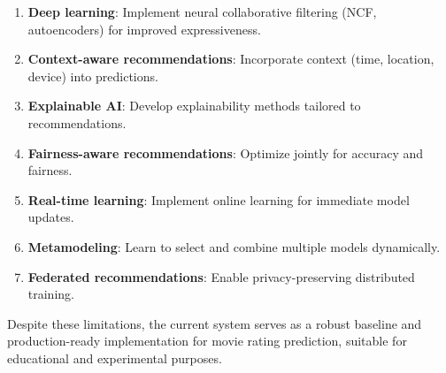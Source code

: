 \begin{enumerate}
  \item \textbf{Deep learning}: Implement neural collaborative filtering (NCF, autoencoders) for improved 
  expressiveness.
  
  \item \textbf{Context-aware recommendations}: Incorporate context (time, location, device) into predictions.
  
  \item \textbf{Explainable AI}: Develop explainability methods tailored to recommendations.
  
  \item \textbf{Fairness-aware recommendations}: Optimize jointly for accuracy and fairness.
  
  \item \textbf{Real-time learning}: Implement online learning for immediate model updates.
  
  \item \textbf{Metamodeling}: Learn to select and combine multiple models dynamically.
  
  \item \textbf{Federated recommendations}: Enable privacy-preserving distributed training.
\end{enumerate}

Despite these limitations, the current system serves as a robust baseline and production-ready implementation 
for movie rating prediction, suitable for educational and experimental purposes.
